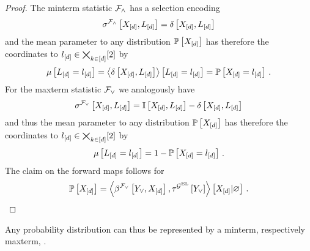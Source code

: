 \begin{proof}
    The minterm statistic $\mathcal{F}_{\land}$ has a selection encoding
    \begin{align*}
        \sigma^{\mathcal{F}_{\land}}\left[X_{[d]},L_{[d]}\right]
        = \delta\left[X_{[d]},L_{[d]}\right]
    \end{align*}
    and the mean parameter to any distribution $\mathbb{P}\left[X_{[d]}\right]$ has therefore the coordinates to $l_{[d]}\in\bigtimes_{k\in[d]}[2]$ by
    \begin{align*}
        \mu\left[L_{[d]}=l_{[d]}\right]
        = \left\langle \delta\left[X_{[d]},L_{[d]}\right]\right\rangle \left[ L_{[d]}=l_{[d]} \right]
        = \mathbb{P}\left[X_{[d]}=l_{[d]}\right] \, .
    \end{align*}
    For the maxterm statistic $\mathcal{F}_{\lor}$ we analogously have
    \begin{align*}
        \sigma^{\mathcal{F}_{\lor}}\left[X_{[d]},L_{[d]}\right]
        = \mathbb{I}\left[X_{[d]},L_{[d]}\right]-\delta\left[X_{[d]},L_{[d]}\right]
    \end{align*}
    and thus the mean parameter to any distribution $\mathbb{P}\left[X_{[d]}\right]$ has therefore the coordinates to $l_{[d]}\in\bigtimes_{k\in[d]}[2]$ by
    \begin{align*}
        \mu\left[L_{[d]}=l_{[d]}\right]
        = 1-\mathbb{P}\left[X_{[d]}=l_{[d]}\right] \, .
    \end{align*}
    The claim on the forward maps follows for
    \begin{align*}
        \mathbb{P}\left[X_{[d]}\right]=\left\langle \beta^{\mathcal{F}_{\lor}}\left[Y_{\lor},X_{[d]}\right],
            \tau^{\mathcal{G}^{\mathrm{EL}}}\left[Y_{\lor}\right]\right\rangle \left[ X_{[d]} | \varnothing \right] \, .
    \end{align*}


\end{proof}

Any probability distribution can thus be represented by a minterm, respectively maxterm, \HybridLogicNetwork{}. %


